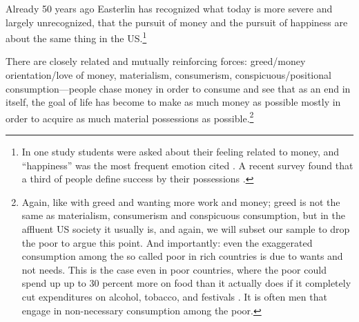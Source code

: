 \documentclass[10pt, letterpaper]{article}
\begin{document}
\begin{spacing}{1.8}
 Already 50 years ago Easterlin has recognized what today is more severe and
 largely unrecognized, that  the pursuit of money and the pursuit of happiness are about the same thing in the US.\footnote{In one study students were asked about their feeling related to money, and ``happiness'' was the most frequent emotion cited \citep{mogilner2010pursuit}.
A recent survey found that a third of people define success by their possessions \citep[cited in][]{joye20}.}
%
%
%
%
%
%

There are closely related and mutually reinforcing forces: greed/money orientation/love of money, materialism, consumerism, conspicuous/positional
consumption---people chase money in order to consume and see that as an end in itself, the goal of life has become to make as much money as possible mostly in
order to acquire as much material possessions as possible.\footnote{Again, like
  with greed and wanting more work and money; greed is not the same as
  materialism, consumerism  and conspicuous consumption, but in the affluent US
  society it usually is, and again, we will subset our sample to drop the poor to argue this point. 
%
And importantly: even the exaggerated consumption among the so called poor in rich countries is due to wants and not needs. This is the case even in poor countries, where the poor could spend up up to 30 percent more on food than it actually does if it completely cut expenditures on alcohol, tobacco, and festivals \citep{banerjee11}.
It is often men that engage in non-necessary consumption among the poor. 

}
\end{spacing}
\end{document}
